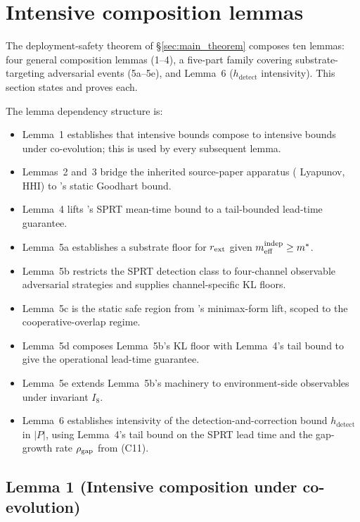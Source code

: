 \section{Intensive composition lemmas}
\label{sec:lemmas}

The deployment-safety theorem of \S\ref{sec:main_theorem} composes
ten lemmas: four general composition lemmas (1--4), a five-part
family covering substrate-targeting adversarial events (5a--5e),
and Lemma~6 ($h_{\mathrm{detect}}$ intensivity).  This section
states and proves each.

The lemma dependency structure is:
\begin{itemize}
\item Lemma~1 establishes that intensive bounds compose to intensive
  bounds under co-evolution; this is used by every subsequent lemma.
\item Lemmas~2 and~3 bridge the inherited source-paper apparatus
  (\citep[Phase~Redundancy]{lasser2026phase} Lyapunov, \citep[Need~Sufficiency]{lasser2026paper8b} HHI) to \citep[Microfoundation]{lasser2026micro}'s static Goodhart
  bound.
\item Lemma~4 lifts \citep[Exogenous~Verification]{lasser2026exo}'s SPRT mean-time bound to a tail-bounded
  lead-time guarantee.
\item Lemma~5a establishes a substrate floor for $r_{\mathrm{ext}}$ given
  $m_{\mathrm{eff}}^{\mathrm{indep}} \geq m^*$.
\item Lemma~5b restricts the SPRT detection class to four-channel
  observable adversarial strategies and supplies channel-specific
  KL floors.
\item Lemma~5c is the static safe region from
    \citep[Horizon~Aware]{lasser2026horizon}'s minimax-form lift, scoped to the
    cooperative-overlap regime.
\item Lemma~5d composes Lemma~5b's KL floor with Lemma~4's tail
  bound to give the operational lead-time guarantee.
\item Lemma~5e extends Lemma~5b's machinery to environment-side
  observables under invariant $I_8$.
\item Lemma~6 establishes intensivity of the detection-and-correction
  bound $h_{\mathrm{detect}}$ in $|P|$, using Lemma~4's tail bound on
  the SPRT lead time and the gap-growth rate $\rho_{\mathrm{gap}}$ from (C11).
\end{itemize}

\subsection{Lemma 1 (Intensive composition under co-evolution)}
\label{sec:lem1}


